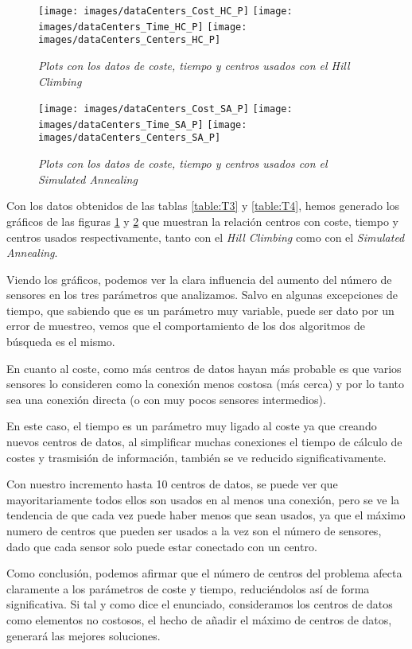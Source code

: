 \documentclass{article}
\begin{document}
\begin{enumerate}
  \begin{figure}[ht]
    \centering
    \texttt{[image: images/dataCenters\_Cost\_HC\_P]}\hfill
    \texttt{[image: images/dataCenters\_Time\_HC\_P]}\hfill
    \texttt{[image: images/dataCenters\_Centers\_HC\_P]}
    \caption{\textit{Plots con los datos de coste, tiempo y centros usados con el \textit{Hill Climbing}}}
    \label{fig:DCCH}
  \end{figure}
  \begin{figure}[ht]
    \centering
    \texttt{[image: images/dataCenters\_Cost\_SA\_P]}\hfill
    \texttt{[image: images/dataCenters\_Time\_SA\_P]}\hfill
    \texttt{[image: images/dataCenters\_Centers\_SA\_P]}
    \caption{\textit{Plots con los datos de coste, tiempo y centros usados con el \textit{Simulated Annealing}}}
    \label{fig:DCSA}
  \end{figure}

  Con los datos obtenidos de las tablas \ref{table:T3} y \ref{table:T4}, hemos generado los gráficos de las figuras \ref{fig:DCCH} y \ref{fig:DCSA} que muestran la relación centros con coste, tiempo y centros usados respectivamente, tanto con el \textit{Hill Climbing} como con el \textit{Simulated Annealing}.

  Viendo los gráficos, podemos ver la clara influencia del aumento del número de sensores en los tres parámetros que analizamos. Salvo en algunas excepciones de tiempo, que sabiendo que es un parámetro muy variable, puede ser dato por un error de muestreo, vemos que el comportamiento de los dos algoritmos de búsqueda es el mismo.\par
  En cuanto al coste, como más centros de datos hayan más probable es que varios sensores lo consideren como la conexión menos costosa (más cerca) y por lo tanto sea una conexión directa (o con muy pocos sensores intermedios).\par
  En este caso, el tiempo es un parámetro muy ligado al coste ya que creando nuevos centros de datos, al simplificar muchas conexiones el tiempo de cálculo de costes y trasmisión de información, también se ve reducido significativamente.\par
  Con nuestro incremento hasta 10 centros de datos, se puede ver que mayoritariamente todos ellos son usados en al menos una conexión, pero se ve la tendencia de que cada vez puede haber menos que sean usados, ya que el máximo numero de centros que pueden ser usados a la vez son el número de sensores, dado que cada sensor solo puede estar conectado con un centro.\par
  Como conclusión, podemos afirmar que el número de centros del problema afecta claramente a los parámetros de coste y tiempo, reduciéndolos así de forma significativa. Si tal y como dice el enunciado, consideramos los centros de datos como elementos no costosos, el hecho de añadir el máximo de centros de datos, generará las mejores soluciones.


\end{enumerate}
\end{document}
